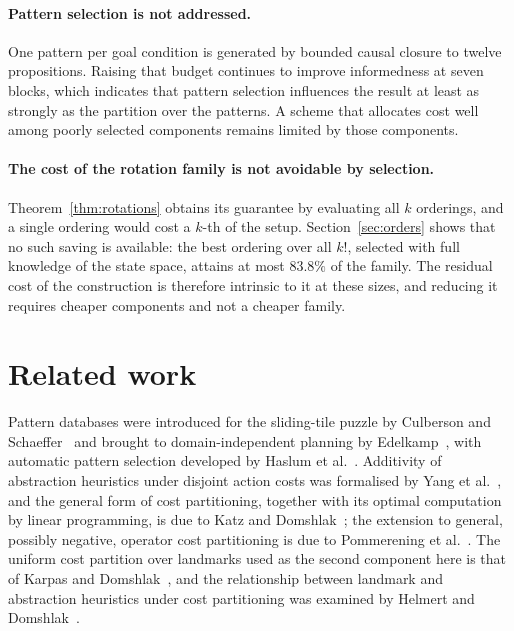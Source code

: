 \documentclass[10pt,twocolumn,a4paper]{article}
\theoremstyle{plain}
\theoremstyle{definition}
\theoremstyle{remark}
\begin{document}
\paragraph{Pattern selection is not addressed.}
One pattern per goal condition is generated by bounded causal closure to twelve
propositions. Raising that budget continues to improve informedness at seven
blocks, which indicates that pattern selection influences the result at least
as strongly as the partition over the patterns. A scheme that allocates cost
well among poorly selected components remains limited by those components.

\paragraph{The cost of the rotation family is not avoidable by selection.}
Theorem~\ref{thm:rotations} obtains its guarantee by evaluating all $k$
orderings, and a single ordering would cost a $k$-th of the setup.
Section~\ref{sec:orders} shows that no such saving is available: the best
ordering over all $k!$, selected with full knowledge of the state space,
attains at most $83.8\%$ of the family. The residual cost of the construction is
therefore intrinsic to it at these sizes, and reducing it requires cheaper
components and not a cheaper family.

\section{Related work}
\label{sec:related}

Pattern databases were introduced for the sliding-tile puzzle by Culberson and
Schaeffer~\cite{culberson1998} and brought to domain-independent planning by
Edelkamp~\cite{edelkamp2001}, with automatic pattern selection developed by
Haslum et al.~\cite{haslum2007}. Additivity of abstraction heuristics under
disjoint action costs was formalised by Yang et al.~\cite{yang2008}, and the
general form of cost partitioning, together with its optimal computation by
linear programming, is due to Katz and Domshlak~\cite{katz2008}; the extension
to general, possibly negative, operator cost partitioning is due to Pommerening
et al.~\cite{pommerening2015}. The uniform cost partition over landmarks used
as the second component here is that of Karpas and
Domshlak~\cite{karpas2009}, and the relationship between landmark and
abstraction heuristics under cost partitioning was examined by Helmert and
Domshlak~\cite{helmert2009}.
\end{document}
